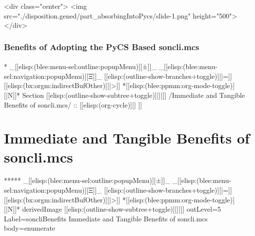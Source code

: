 \begin{htmlonly}

\begin{frame}[fragile,plain,label=part_absorbingIntoPycs]
    \frametitle{}
    \framesubtitle{}
    \begin{rawhtml}
<div class="center">
<img src="./disposition.gened/part_absorbingIntoPycs/slide-1.png" height="500">
</div>
    \end{rawhtml}
\end{frame}
\end{htmlonly}

\begin{verblatex}

\begin{frame}[fragile,label=part_absorbingIntoPycs]
    \frametitle{Benefits of Adopting the PyCS Based soncli.mcs}
    \framesubtitle{}

    \tableofcontents

\end{frame}
\end{verblatex}


\begin{whenOrg}
*  _[[elisp:(blee:menu-sel:outline:popupMenu)][±]]_ _[[elisp:(blee:menu-sel:navigation:popupMenu)][Ξ]]_ [[elisp:(outline-show-branches+toggle)][|=]] [[elisp:(bx:orgm:indirectBufOther)][|>]] *[[elisp:(blee:ppmm:org-mode-toggle)][|N]]*  Section    [[elisp:(outline-show-subtree+toggle)][||]]   /Immediate and Tangible Benefits of soncli.mcs/ ::  [[elisp:(org-cycle)][| ]]
\end{whenOrg}

\section{Immediate and Tangible Benefits of soncli.mcs}


\begin{whenOrg}
*****  _[[elisp:(blee:menu-sel:outline:popupMenu)][±]]_ _[[elisp:(blee:menu-sel:navigation:popupMenu)][Ξ]]_ [[elisp:(outline-show-branches+toggle)][|=]] [[elisp:(bx:orgm:indirectBufOther)][|>]] *[[elisp:(blee:ppmm:org-mode-toggle)][|N]]*  derivedImage [[elisp:(outline-show-subtree+toggle)][||]] outLevel=5 Label=soncliBenefits Immediate and Tangible Benefits of soncli.mcs body=enumerate
\end{whenOrg}

